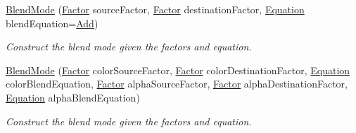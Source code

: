 \begin{DoxyCompactItemize}
\hyperlink{structsf_1_1_blend_mode_a23c7452cc8e9eb943c3aea6234ce4297}{Blend\-Mode} (\hyperlink{structsf_1_1_blend_mode_afb9852caf356b53bb0de460c58a9ebbb}{Factor} source\-Factor, \hyperlink{structsf_1_1_blend_mode_afb9852caf356b53bb0de460c58a9ebbb}{Factor} destination\-Factor, \hyperlink{structsf_1_1_blend_mode_a7bce470e2e384c4f9c8d9595faef7c32}{Equation} blend\-Equation=\hyperlink{structsf_1_1_blend_mode_a7bce470e2e384c4f9c8d9595faef7c32ada07390f79e829c0eeb83909d3b828dc}{Add})
\begin{DoxyCompactList}\small\item\em Construct the blend mode given the factors and equation. \end{DoxyCompactList}\item 
\hyperlink{structsf_1_1_blend_mode_a69a12c596114e77126616e7e0f7d798b}{Blend\-Mode} (\hyperlink{structsf_1_1_blend_mode_afb9852caf356b53bb0de460c58a9ebbb}{Factor} color\-Source\-Factor, \hyperlink{structsf_1_1_blend_mode_afb9852caf356b53bb0de460c58a9ebbb}{Factor} color\-Destination\-Factor, \hyperlink{structsf_1_1_blend_mode_a7bce470e2e384c4f9c8d9595faef7c32}{Equation} color\-Blend\-Equation, \hyperlink{structsf_1_1_blend_mode_afb9852caf356b53bb0de460c58a9ebbb}{Factor} alpha\-Source\-Factor, \hyperlink{structsf_1_1_blend_mode_afb9852caf356b53bb0de460c58a9ebbb}{Factor} alpha\-Destination\-Factor, \hyperlink{structsf_1_1_blend_mode_a7bce470e2e384c4f9c8d9595faef7c32}{Equation} alpha\-Blend\-Equation)
\begin{DoxyCompactList}\small\item\em Construct the blend mode given the factors and equation. \end{DoxyCompactList}\end{DoxyCompactItemize}
